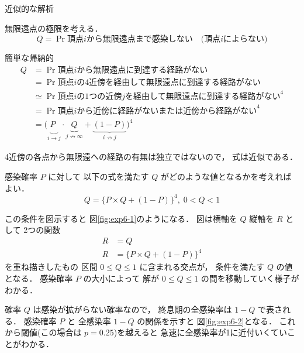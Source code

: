 \documentclass[10pt,oneside]{scrartcl}
\begin{document}
近似的な解析

無限遠点の極限を考える．
\begin{equation}
  Q
  =\Pr{\text{頂点$i$から無限遠点まで感染しない}}
  \quad\text{(頂点$i$によらない)}
\end{equation}

簡単な帰納的
\begin{align}
  Q
  &=\Pr{\text{頂点$i$から無限遠点に到達する経路がない}}\\
  &=\Pr{\text{頂点$i$の4近傍を経由して無限遠点に到達する経路がない}}\\
  &\simeq\Pr{\text{頂点$i$の1つの近傍$j$を経由して無限遠点に到達する経路がない}}^{4}\\
  &=\Pr{\text{頂点$i$から近傍に経路がない}\text{または}
    \text{近傍から経路がない}}^{4}\\
  &=\bigl(
    \underbrace{P_{\phantom{j}}}_{i\to j}
    \cdot\underbrace{Q}_{j\not\to\infty}+
    \underbrace{(1-P)}_{i\not\to j}
    \bigr)^{4}
\end{align}

4近傍の各点から無限遠への経路の有無は独立ではないので，
式は近似である．


感染確率 \(P\) に対して
以下の式を満たす \(Q\) がどのような値となるかを考えればよい．
\begin{equation}
  Q=\{P\times Q + (1-P)\}^{4},\;0<Q<1
\end{equation}

\begin{figure}%
  \centering
  \myGraph*{}
\end{figure}

この条件を図示すると
図\ref{fig:exp6-1}のようになる．
図は横軸を \(Q\)
縦軸を \(R\) として
2つの関数
\begin{align}
  R&=Q\\
  R&=\{P\times Q + (1-P)\}^{4}
\end{align}
を重ね描きしたもの
区間 \(0\le Q\le 1\) に含まれる交点が，
条件を満たす \(Q\) の値となる．
感染確率 \(P\) の大小によって
解が \(0\le Q\le 1\) の間を移動していく様子がわかる．

\begin{figure}%
  \centering
  \myGraph*{}
\end{figure}

確率 \(Q\) は感染が拡がらない確率なので，
終息期の全感染率は \(1-Q\) で表される．
感染確率 \(P\) と 
全感染率 \(1-Q\) の関係を示すと
図\ref{fig:exp6-2}となる．
これから閾値(この場合は \(p=0.25\))を越えると
急速に全感染率が1に近付いくていことがわかる．
\end{document}

